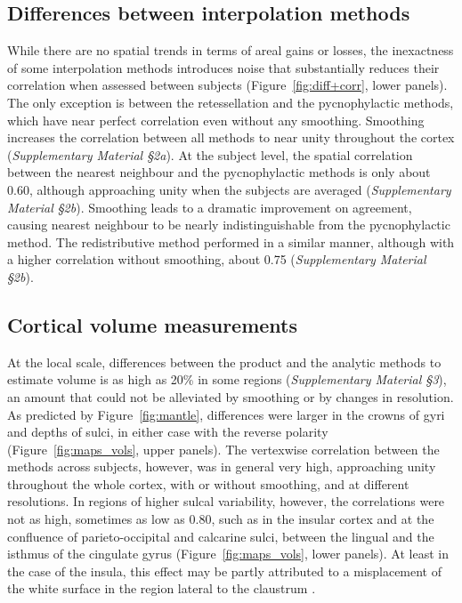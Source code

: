 \subsection{Differences between interpolation methods}

While there are no spatial trends in terms of areal gains or losses, the inexactness of some interpolation methods introduces noise that substantially reduces their correlation when assessed between subjects (Figure~\ref{fig:diff+corr}, lower panels). The only exception is between the retessellation and the pycnophylactic methods, which have near perfect correlation even without any smoothing. Smoothing increases the correlation between all methods to near unity throughout the cortex (\emph{Supplementary Material §2a}). At the subject level, the spatial correlation between the nearest neighbour and the pycnophylactic methods is only about 0.60, although approaching unity when the subjects are averaged (\emph{Supplementary Material §2b}). Smoothing leads to a dramatic improvement on agreement, causing nearest neighbour to be nearly indistinguishable from the pycnophylactic method. The redistributive method performed in a similar manner, although with a higher correlation without smoothing, about 0.75 (\emph{Supplementary Material §2b}).

\subsection{Cortical volume measurements}

At the local scale, differences between the product and the analytic methods to estimate volume is as high as 20\% in some regions (\emph{Supplementary Material §3}), an amount that could not be alleviated by smoothing or by changes in resolution. As predicted by Figure~\ref{fig:mantle}, differences were larger in the crowns of gyri and depths of sulci, in either case with the reverse polarity (Figure~\ref{fig:maps_vols}, upper panels). The vertexwise correlation between the methods across subjects, however, was in general very high, approaching unity throughout the whole cortex, with or without smoothing, and at different resolutions. In regions of higher sulcal variability, however, the correlations were not as high, sometimes as low as 0.80, such as in the insular cortex and at the confluence of parieto-occipital and calcarine sulci, between the lingual and the isthmus of the cingulate gyrus (Figure~\ref{fig:maps_vols}, lower panels). At least in the case of the insula, this effect may be partly attributed to a misplacement of the white surface in the region lateral to the claustrum \citep{Glasser2016}.

